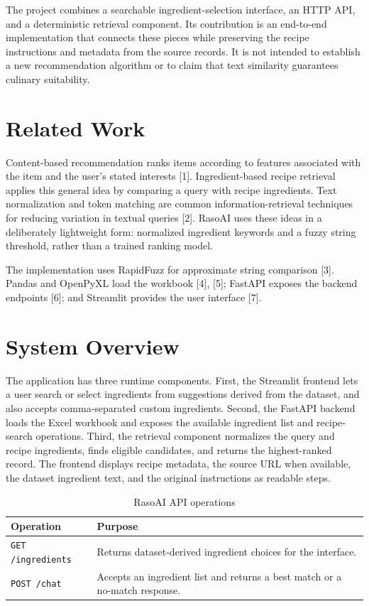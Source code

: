 \documentclass[conference]{IEEEtran}
\begin{document}
The project combines a searchable ingredient-selection interface, an HTTP API, and a deterministic retrieval component. Its contribution is an end-to-end implementation that connects these pieces while preserving the recipe instructions and metadata from the source records. It is not intended to establish a new recommendation algorithm or to claim that text similarity guarantees culinary suitability.

\section{Related Work}
Content-based recommendation ranks items according to features associated with the item and the user's stated interests [1]. Ingredient-based recipe retrieval applies this general idea by comparing a query with recipe ingredients. Text normalization and token matching are common information-retrieval techniques for reducing variation in textual queries [2]. RasoAI uses these ideas in a deliberately lightweight form: normalized ingredient keywords and a fuzzy string threshold, rather than a trained ranking model.

The implementation uses RapidFuzz for approximate string comparison [3]. Pandas and OpenPyXL load the workbook [4], [5]; FastAPI exposes the backend endpoints [6]; and Streamlit provides the user interface [7].

\section{System Overview}
The application has three runtime components. First, the Streamlit frontend lets a user search or select ingredients from suggestions derived from the dataset, and also accepts comma-separated custom ingredients. Second, the FastAPI backend loads the Excel workbook and exposes the available ingredient list and recipe-search operations. Third, the retrieval component normalizes the query and recipe ingredients, finds eligible candidates, and returns the highest-ranked record. The frontend displays recipe metadata, the source URL when available, the dataset ingredient text, and the original instructions as readable steps.

\begin{table}[htbp]
\caption{RasoAI API operations}
\label{tab:api}
\centering
\begin{tabular}{|p{}|p{}|}
\hline
\textbf{Operation} & \textbf{Purpose}\\
\hline
\texttt{GET /ingredients} & Returns dataset-derived ingredient choices for the interface.\\
\hline
\texttt{POST /chat} & Accepts an ingredient list and returns a best match or a no-match response.\\
\hline
\end{tabular}
\end{table}
\end{document}
